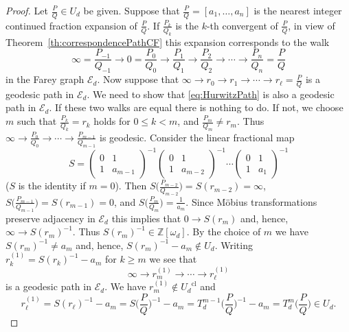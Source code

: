\documentclass[graybox]{svmult}
\begin{document}
\begin{proof}
Let $\frac{P}{Q} \in U_{d}$ be given. Suppose that
$\frac{P}{Q}= [a_1,\ldots, a_n]$ is the nearest integer continued fraction expansion of 
$\frac{P}{Q}$. If $\frac{P_k}{Q_k}$ is the $k$-th convergent of $\frac PQ$, in view of Theorem~\ref{th:correspondencePathCF} this expansion corresponds to the walk
\begin{equation}\label{eq:HurwitzPath}
\infty=\frac{P_{-1}}{Q_{-1}} \to 0=\frac{P_0}{Q_0} \to \frac{P_1}{Q_1} \to \frac{P_2}{Q_2} \to \cdots \to \frac{P_n}{Q_n}=\frac{P}{Q}
\end{equation}
in the Farey graph $\mathcal{E}_{d}$. Now suppose that
$\infty \to r_0 \to r_1 \to \cdots \to r_{\ell}=\frac{P}{Q}$ is a geodesic path in $\mathcal{E}_{d}$. We need to show that \eqref{eq:HurwitzPath} is also a geodesic path in $\mathcal{E}_{d}$. If these two walks are equal there is nothing to do. If not, we choose $m$ such that $\frac{P_{k}}{Q_{k}}=r_{k}$ holds for $0 \leq k <m$, and $\frac{P_m}{Q_m} \neq r_m$. Thus $\infty \to \frac{P_0}{Q_0}\to\cdots\to \frac{P_{m-1}}{Q_{m-1}}$ is geodesic. Consider the linear fractional map 
$$
S=\begin{pmatrix}
0 & 1 \\
1 & a_{m-1}
\end{pmatrix}^{-1}
\begin{pmatrix}
0 & 1 \\
1 & a_{m-2}
\end{pmatrix}^{-1} 
\cdots 
\begin{pmatrix}
0 & 1 \\
1 & a_1
\end{pmatrix}^{-1}
$$
($S$ is the identity if $m=0$).  Then $S\big(\frac{P_{m-2}}{Q_{m-2}}\big)=S(r_{m-2})=\infty$, $S\big(\frac{P_{m-1}}{Q_{m-1}}\big)=S(r_{m-1})=0$, and $S\big(\frac{P_m}{Q_m}\big)=\frac{1}{a_m}$. 
Since M\"obius transformations preserve adjacency in $\mathcal{E}_d$ this implies that $0 \to S\left(r_m\right)$ and, hence, $\infty \to S\left(r_m\right)^{-1}$. Thus
$S\left(r_m\right)^{-1}\in\mathbb Z[\omega_{d}]$. By the choice of $m$ we have  $S\left(r_m\right)^{-1}\not=a_m$ and, hence, $S\left(r_m\right)^{-1}-a_m \notin U_d$. 
Writing $r_k^{(1)}=S\left(r_k\right)^{-1}-a_m$ for $k \geq m$ we see that  
\begin{equation}\label{eq:rprimepath}
\infty \to r_m^{(1)} \to \cdots \to r_\ell^{(1)}
\end{equation}
is a geodesic path in $\mathcal{E}_d$. We have $r_m^{(1)}\not\in{U_{d}}^{\mathrm{cl}}$ and  
\[
r_{\ell}^{(1)}=S(r_\ell)^{-1}-a_m= S\big(\frac PQ\big)^{-1}-a_m= T_{d}^{m-1}\big(\frac PQ\big)^{-1}-a_m = T_{d}^m\big(\frac PQ\big) \in U_{d}.
\]
\end{proof}
\end{document}
